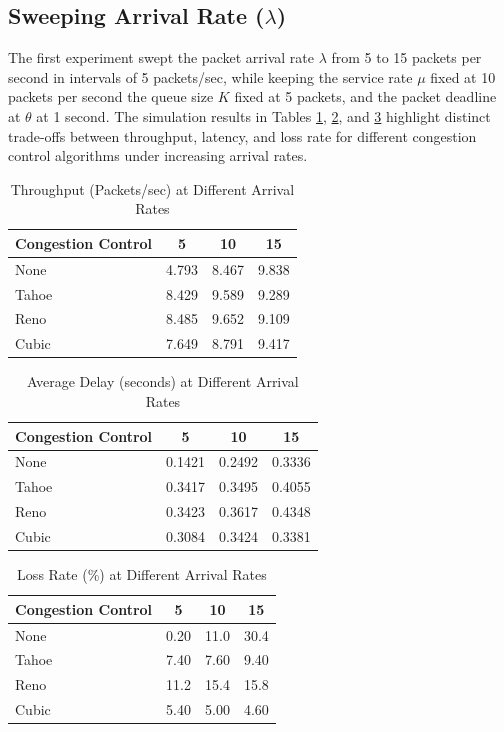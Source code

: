 \documentclass[conference]{IEEEtran}
\begin{document}
\subsection{Sweeping Arrival Rate ($\lambda$)}
The first experiment swept the packet arrival rate $\lambda$ from 5 to 15 packets per second in intervals of 5 packets/sec, while keeping the service rate $\mu$ fixed at 10 packets per second
the queue size $K$ fixed at 5 packets, and the packet deadline at $\theta$ at 1 second.
The simulation results in Tables \ref{tab:lambda_throughput}, \ref{tab:lambda_avg_delay}, and \ref{tab:lambda_loss_rate} highlight distinct trade-offs between throughput, latency, and loss rate for different congestion control algorithms under increasing arrival rates.

\begin{table}[h!]
    \centering
    \caption{Throughput (Packets/sec) at Different Arrival Rates}
    \begin{tabular}{lccc}
    \toprule
    \textbf{Congestion Control} & \textbf{5} & \textbf{10} & \textbf{15} \\
    \midrule
        None  & 4.793 & 8.467 & 9.838 \\
        Tahoe & 8.429 & 9.589 & 9.289 \\
        Reno  & 8.485 & 9.652 & 9.109 \\
        Cubic & 7.649 & 8.791 & 9.417 \\
    \bottomrule
    \end{tabular}
    \label{tab:lambda_throughput}
\end{table}

\begin{table}[h!]
    \centering
    \caption{Average Delay (seconds) at Different Arrival Rates}
    \begin{tabular}{lccc}
    \toprule
    \textbf{Congestion Control} & \textbf{5} & \textbf{10} & \textbf{15} \\
    \midrule
    None  & 0.1421 & 0.2492 & 0.3336 \\
    Tahoe & 0.3417 & 0.3495 & 0.4055 \\
    Reno  & 0.3423 & 0.3617 & 0.4348 \\
    Cubic & 0.3084 & 0.3424 & 0.3381 \\
    \bottomrule
    \end{tabular}
    \label{tab:lambda_avg_delay}
\end{table}

\begin{table}[h!]
    \centering
    \caption{Loss Rate (\%) at Different Arrival Rates}
    \begin{tabular}{lccc}
    \toprule
    \textbf{Congestion Control} & \textbf{5} & \textbf{10} & \textbf{15} \\
    \midrule
        None  & 0.20 & 11.0 & 30.4 \\
        Tahoe & 7.40 & 7.60 & 9.40 \\
        Reno  & 11.2 & 15.4 & 15.8 \\
        Cubic & 5.40 & 5.00 & 4.60 \\
    \bottomrule
    \end{tabular}
    \label{tab:lambda_loss_rate}
\end{table}
\end{document}
